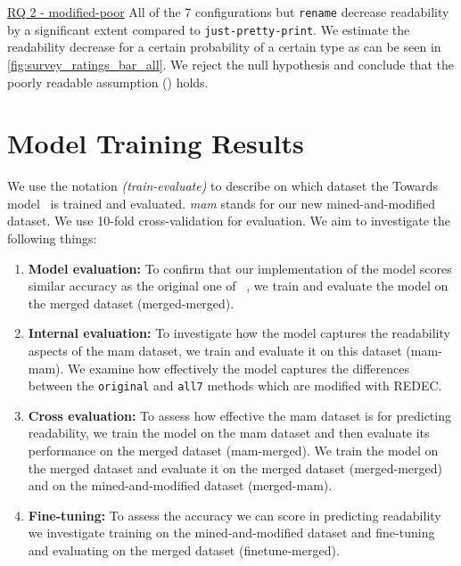 \documentclass[%
class=scrreprt,
chapterprefix=false,%
open=right,%
twoside=true,%
paper=a4,%
logofile={Logo\_zentral\_farbig\_EN.png},%
thesistype=master,%
UKenglish,%
]{se2thesis}
\theoremstyle{definition}
\newcommand{\rdh}{REDEC\xspace}
\newcommand{\none}{just-pretty-print\xspace} %
\newcommand{\nonet}{\texttt{\none}\xspace} %
\begin{document}
	\begin{summary}{\hyperref[modified-poor]{RQ 2 - modified-poor}}
		All of the 7 configurations but \texttt{rename} decrease readability by a significant extent compared to \nonet. We estimate the readability decrease for a certain probability of a certain type as can be seen in \autoref{fig:survey_ratings_bar_all}. We reject the null hypothesis and conclude that the poorly readable assumption () holds.
	\end{summary}

\section{Model Training Results} \label{Model training results}
	We use the notation \textit{(train-evaluate)} to describe on which dataset the Towards model~\cite{mi2022towards} is trained and evaluated. \textit{mam} stands for our new mined-and-modified dataset. We use 10-fold cross-validation for evaluation.
	We aim to investigate the following things:
	
	\begin{enumerate}
		\item \textbf{Model evaluation:}
		To confirm that our implementation of the model scores similar accuracy as the original one of \citeauthor{mi2022towards}~\cite{mi2022towards}, we train and evaluate the model on the merged dataset (merged-merged).
		
		\item \textbf{Internal evaluation:} 
		To investigate how the model captures the readability aspects of the mam dataset, we train and evaluate it on this dataset (mam-mam). We examine how effectively the model captures the differences between the \texttt{original} and \texttt{all7} methods which are modified with \rdh.
		
		\item \textbf{Cross evaluation:} 
		To assess how effective the mam dataset is for predicting readability, we train the model on the mam dataset and then evaluate its performance on the merged dataset (mam-merged). We train the model on the merged dataset and evaluate it on the merged dataset (merged-merged) and on the mined-and-modified dataset (merged-mam).
		
		\item \textbf{Fine-tuning:} 
		To assess the accuracy we can score in predicting readability we investigate training on the mined-and-modified dataset and fine-tuning and evaluating on the merged dataset (finetune-merged).		
		
	\end{enumerate}
	
\end{document}
